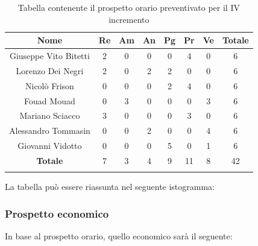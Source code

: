 			\begin{longtable}{|c|c|c|c|c|c|c|c}
				\hline
				\rowcolor{lighter-grayer}
				\textbf{Nome} & \textbf{Re} & \textbf{Am} & \textbf{An} & \textbf{Pg}  & \textbf{Pr}   & \textbf{Ve} & \textbf{Totale} \\
				\hline
				\endfirsthead
				\hline
				Giuseppe Vito Bitetti & 2 & 0 & 0 & 0 & 4 & 0 & 6\\
				\hline
				\hline
				Lorenzo Dei Negri & 2 & 0 & 2 & 2 & 0 & 0 & 6\\
				\hline
				\hline
				Nicolò Frison & 0 & 0 & 0 & 2 & 4 & 0 & 6\\
				\hline
				\hline
				Fouad Mouad & 0 & 3 & 0 & 0 & 0 & 3 & 6\\
				\hline
				\hline
				Mariano Sciacco & 3 & 0 & 0 & 0 & 3 & 0 & 6\\
				\hline
				\hline
				Alessandro Tommasin & 0 & 0 & 2 & 0 & 0 & 4 & 6\\
				\hline
				\hline
				Giovanni Vidotto & 0 & 0 & 0 & 5 & 0 & 1 & 6\\
				\hline 
				\textbf{Totale} & 7 &  3 & 4 & 9 & 11 & 8 & 42 \\
				\hline 
				
				\caption{Tabella contenente il prospetto orario preventivato per il IV incremento}
			\end{longtable}
			\pagebreak	
			
			La tabella può essere riassunta nel seguente istogramma:
			
			
		\subsubsection{Prospetto economico}
			In base al prospetto orario, quello economico sarà il seguente: 
			
